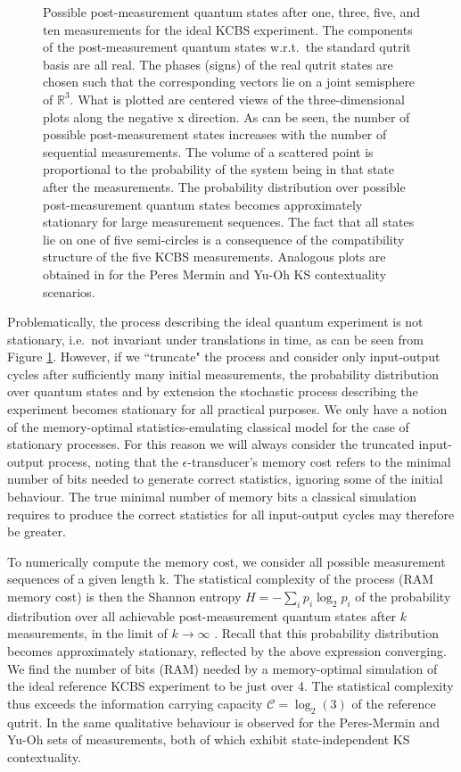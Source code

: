 \begin{figure}
        \caption{Possible post-measurement quantum states after one, three, five, and ten measurements for the ideal KCBS experiment. The components of the post-measurement quantum states w.r.t.\ the standard qutrit basis are all real. The phases (signs) of the real qutrit states are chosen such that the corresponding vectors lie on a joint semisphere of $\mathbb{R}^3$. What is plotted are centered views of the three-dimensional plots along the negative x direction. As can be seen, the number of possible post-measurement states increases with the number of sequential measurements. The volume of a scattered point is proportional to the probability of the system being in that state after the measurements. The probability distribution over possible post-measurement quantum states becomes approximately stationary for large measurement sequences. The fact that all states lie on one of five semi-circles is a consequence of the compatibility structure of the five KCBS measurements. Analogous plots are obtained in \cite{Cabello2018} for the Peres Mermin and Yu-Oh KS contextuality scenarios.}
        \label{fig:causalstates}
    \end{figure}

Problematically, the process describing the ideal quantum experiment is not stationary, i.e.\ not invariant under translations in time, as can be seen from Figure \ref{fig:causalstates}. However, if we ``truncate" the process and consider only input-output cycles after sufficiently many initial measurements, the probability distribution over quantum states and by extension the stochastic process describing the experiment becomes stationary for all practical purposes. We only have a notion of the memory-optimal statistics-emulating classical model for the case of stationary processes. For this reason we will always consider the truncated input-output process, noting that the $\epsilon$-transducer's memory cost refers to the minimal number of bits needed to generate correct statistics, ignoring some of the initial behaviour. The true minimal number of memory bits a classical simulation requires to produce the correct statistics for all input-output cycles may therefore be greater. 

To numerically compute the memory cost, we consider all possible measurement sequences of a given length k. The statistical complexity of the process (RAM memory cost) is then the Shannon entropy $H=-\sum_ip_i\log_2p_i$ of the probability distribution over all achievable post-measurement quantum states after $k$ measurements, in the limit of $k\rightarrow\infty$ \cite{Cabello2018,Barnett2015}. Recall that this probability distribution becomes approximately stationary, reflected by the above expression converging. We find the number of bits (RAM) needed by a memory-optimal simulation of the ideal reference KCBS experiment to be just over 4. The statistical complexity thus exceeds the information carrying capacity $\mathcal{C}=\log_2(3)$ of the reference qutrit. In \cite{Cabello2018} the same qualitative behaviour is observed for the Peres-Mermin and Yu-Oh sets of measurements, both of which exhibit state-independent KS contextuality. 

